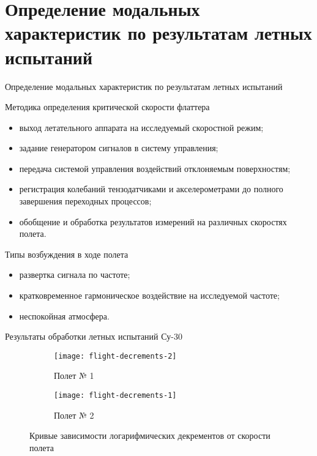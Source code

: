 \section{Определение модальных характеристик по результатам летных испытаний}

\begin{frame}{Определение модальных характеристик по результатам летных испытаний}
	\begin{block}{Методика определения критической скорости флаттера}
		\begin{itemize}
			\item выход летательного аппарата на исследуемый скоростной режим;
			\item задание генератором сигналов в систему управления; 
			\item передача системой управления воздействий отклоняемым поверхностям;
			\item регистрация колебаний тензодатчиками и акселерометрами до полного завершения переходных процессов;
			\item обобщение и обработка результатов измерений на различных скоростях полета.
		\end{itemize}
	\end{block}
	\begin{block}{Типы возбуждения в ходе полета}
		\begin{itemize}
			\item развертка сигнала по частоте; 
			\item кратковременное гармоническое воздействие на исследуемой частоте; 
			\item неспокойная атмосфера.
		\end{itemize}
	\end{block}
\end{frame}

\begin{frame}{Результаты обработки летных испытаний Су-30}
	\begin{figure}
		\begin{subfigure}[b]{0.49\textwidth}
			\centering
	     	\texttt{[image: flight-decrements-2]} 
	     	\caption{Полет № 1}
	    \end{subfigure}
    	\hfill
	    \begin{subfigure}[b]{0.49\textwidth}
			\centering
			\texttt{[image: flight-decrements-1]}
			\caption{Полет № 2}
	    \end{subfigure}
    	\caption{Кривые зависимости логарифмических декрементов от скорости полета}
	\end{figure}
\end{frame}


